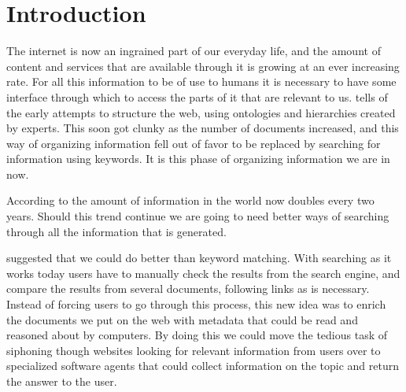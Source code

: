 
\chapter{Introduction} %

\label{Introduction}



The internet is now an ingrained part of our everyday life,
and the amount of content and services that are available through it is growing at an ever increasing rate.
For all this information to be of use to humans it is necessary to have some interface through which to access the parts of it that are relevant to us.
\citet{Shirky2007} tells of the early attempts to structure the web,
using ontologies and hierarchies created by experts.
This soon got clunky as the number of documents increased,
and this way of organizing information fell out of favor to be replaced by searching for information using keywords.
It is this phase of organizing information we are in now.

According to \citet{Gantz2011} the amount of information in the world now doubles every two years.
Should this trend continue we are going to need better ways of searching through all the information that is generated.

\citet{Berners-Lee2001} suggested that we could do better than keyword matching.
With searching as it works today users have to manually check the results from the search engine,
and compare the results from several documents, following links as is necessary.
Instead of forcing users to go through this process,
this new idea was to enrich the documents we put on the web with metadata that could be read and reasoned about by computers.
By doing this we could move the tedious task of siphoning though websites looking for relevant information from users
over to specialized software agents that could collect information on the topic and return the answer to the user.

